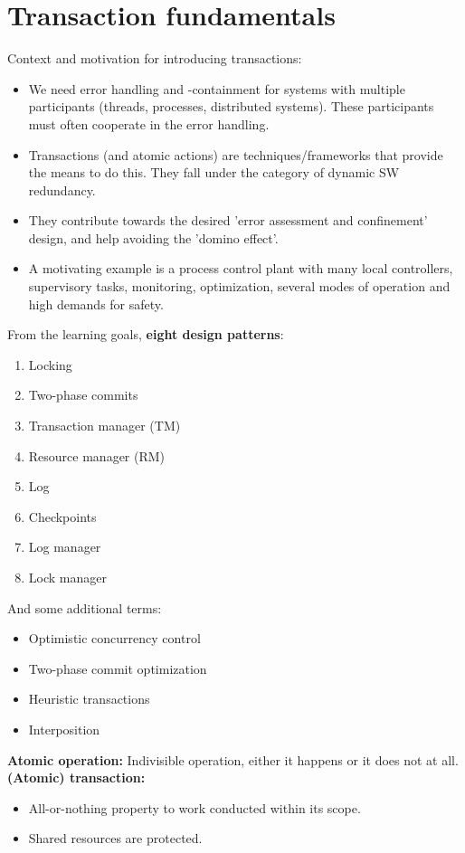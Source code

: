\part{Transaction fundamentals}
Context and motivation for introducing transactions:
\begin{itemize}
    \item We need error handling and -containment for systems with multiple participants (threads, processes, distributed systems). These participants must often cooperate in the error handling.
    \item Transactions (and atomic actions) are techniques/frameworks that provide the means to do this. They fall under the category of dynamic SW redundancy.
    \item They contribute towards the desired 'error assessment and confinement' design, and help avoiding the 'domino effect'.
    \item A motivating example is a process control plant with many local controllers, supervisory tasks, monitoring, optimization, several modes of operation and high demands for safety.
\end{itemize}
From the learning goals, \textbf{eight design patterns}:
\begin{enumerate}
    \item Locking
    \item Two-phase commits
    \item Transaction manager (TM)
    \item Resource manager (RM)
    \item Log 
    \item Checkpoints
    \item Log manager
    \item Lock manager
\end{enumerate}
And some additional terms:
\begin{itemize}
    \item Optimistic concurrency control
    \item Two-phase commit optimization
    \item Heuristic transactions
    \item Interposition
\end{itemize}
\textbf{Atomic operation:} Indivisible operation, either it happens or it does not at all.\newpage
\textbf{(Atomic) transaction:} 
\begin{itemize}
    \item All-or-nothing property to work conducted within its scope.
    \item Shared resources are protected.
\end{itemize}

